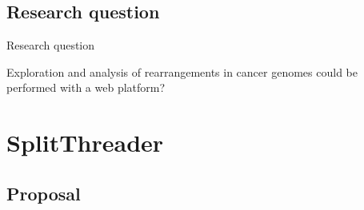 \documentclass[10pt]{beamer}
\newcommand{\1}{
        	\setbeamertemplate{background}{
        		\texttt{[image: img/1\_BIO]}
        		\tikz[overlay] \fill[fill opacity=0.75,fill=white] (0,0) rectangle (-\paperwidth,\paperheight);
        	}
}
\begin{document}
\subsection{Research question}

\begin{frame}{Research question}{}	
	\begin{block}{}
		Exploration and analysis of rearrangements in cancer genomes could be performed with a web platform?
	\end{block}	
\end{frame}


\section{SplitThreader}

\subsection{Proposal}
\end{document}
